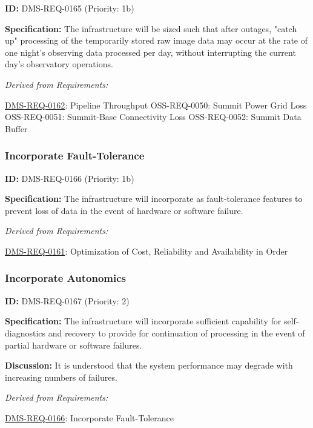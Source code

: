 \documentclass[SE,toc,lsstdraft]{lsstdoc}
\begin{document}
\label{DMS-REQ-0165}
\textbf{ID:} DMS-REQ-0165 (Priority: 1b)

\textbf{Specification: }The infrastructure will be sized such that after outages, "catch up" processing of the temporarily stored raw image data may occur at the rate of one night’s observing data processed per day, without interrupting the current day's observatory operations.

\emph{Derived from Requirements:}

\hyperref[DMS-REQ-0162]{DMS-REQ-0162}:
Pipeline Throughput \newline
OSS-REQ-0050:
Summit Power Grid Loss \newline
OSS-REQ-0051:
Summit-Base Connectivity Loss \newline
OSS-REQ-0052:
Summit Data Buffer \newline

\subsubsection{Incorporate Fault-Tolerance}

\label{DMS-REQ-0166}
\textbf{ID:} DMS-REQ-0166 (Priority: 1b)

\textbf{Specification: }The infrastructure will incorporate as fault-tolerance features to prevent loss of data in the event of hardware or software failure.

\emph{Derived from Requirements:}

\hyperref[DMS-REQ-0161]{DMS-REQ-0161}:
Optimization of Cost, Reliability and Availability in Order \newline

\subsubsection{Incorporate Autonomics}

\label{DMS-REQ-0167}
\textbf{ID:} DMS-REQ-0167 (Priority: 2)

\textbf{Specification:} The infrastructure will incorporate sufficient capability for self-diagnostics and recovery to provide for continuation of processing in the event of partial hardware or software failures.

\textbf{Discussion: }It is understood that the system performance may degrade with increasing numbers of failures.

\emph{Derived from Requirements:}

\hyperref[DMS-REQ-0166]{DMS-REQ-0166}:
Incorporate Fault-Tolerance \newline
\end{document}
